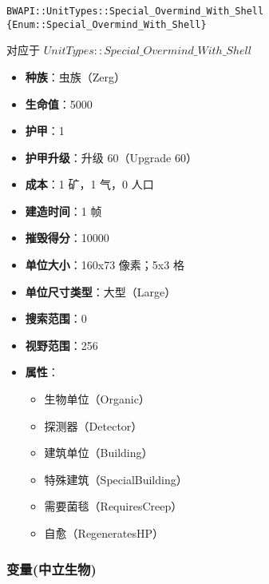 \begin{tcolorbox}[colback=white, colframe=black!60!white, title=Special\_Overmind\_With\_Shell(), arc=0mm]
    \begin{verbatim}
BWAPI::UnitTypes::Special_Overmind_With_Shell {Enum::Special_Overmind_With_Shell}
    \end{verbatim}
    对应于  $UnitTypes::Special\_Overmind\_With\_Shell$ 
    \begin{itemize}
        \item \textbf{种族}：虫族（Zerg）
        \item \textbf{生命值}：5000
        \item \textbf{护甲}：1
        \item \textbf{护甲升级}：升级 60（Upgrade 60）
        \item \textbf{成本}：1 矿，1 气，0 人口
        \item \textbf{建造时间}：1 帧
        \item \textbf{摧毁得分}：10000
        \item \textbf{单位大小}：160x73 像素；5x3 格
        \item \textbf{单位尺寸类型}：大型（Large）
        \item \textbf{搜索范围}：0
        \item \textbf{视野范围}：256
        \item \textbf{属性}：
            \begin{itemize}
                \item 生物单位（Organic）
                \item 探测器（Detector）
                \item 建筑单位（Building）
                \item 特殊建筑（SpecialBuilding）
                \item 需要菌毯（RequiresCreep）
                \item 自愈（RegeneratesHP）
            \end{itemize}
    \end{itemize}
\end{tcolorbox}

\subsubsection{变量(中立生物)}

